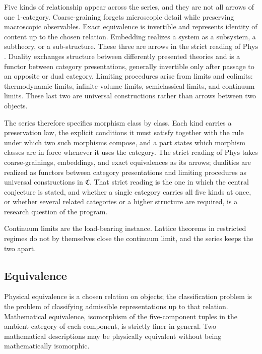 \documentclass[11pt,letterpaper]{article}
\theoremstyle{definition}
\theoremstyle{remark}
\begin{document}
Five kinds of relationship appear across the series, and they are not all arrows of one 1-category. Coarse-graining forgets microscopic detail while preserving macroscopic observables. Exact equivalence is invertible and represents identity of content up to the chosen relation. Embedding realizes a system as a subsystem, a subtheory, or a sub-structure. These three are arrows in the strict reading of $\mathrm{Phys}$. Duality exchanges structure between differently presented theories and is a functor between category presentations, generally invertible only after passage to an opposite or dual category. Limiting procedures arise from limits and colimits: thermodynamic limits, infinite-volume limits, semiclassical limits, and continuum limits. These last two are universal constructions rather than arrows between two objects.

The series therefore specifies morphism class by class. Each kind carries a preservation law, the explicit conditions it must satisfy together with the rule under which two such morphisms compose, and a part states which morphism classes are in force whenever it uses the category. The strict reading of $\mathrm{Phys}$ takes coarse-grainings, embeddings, and exact equivalences as its arrows; dualities are realized as functors between category presentations and limiting procedures as universal constructions in $\mathfrak{C}$. That strict reading is the one in which the central conjecture is stated, and whether a single category carries all five kinds at once, or whether several related categories or a higher structure are required, is a research question of the program.

Continuum limits are the load-bearing instance. Lattice theorems in restricted regimes \cite{corpus-30,corpus-31,corpus-32} do not by themselves close the continuum limit, and the series keeps the two apart.

\subsection{Equivalence}

Physical equivalence is a chosen relation on objects; the classification problem is the problem of classifying admissible representations up to that relation. Mathematical equivalence, isomorphism of the five-component tuples in the ambient category of each component, is strictly finer in general. Two mathematical descriptions may be physically equivalent without being mathematically isomorphic.
\end{document}
